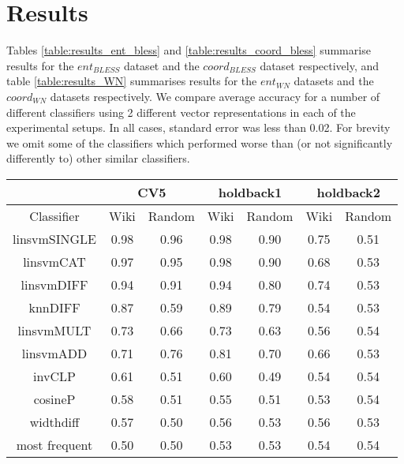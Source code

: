 \documentclass[11pt]{article}
\begin{document}
\section{Results}
\label{sect:results}

Tables \ref{table:results_ent_bless} and \ref{table:results_coord_bless} summarise results for the $ent_{BLESS}$ dataset and the $coord_{BLESS}$ dataset respectively, and table \ref{table:results_WN} summarises results for the $ent_{WN}$ datasets and the $coord_{WN}$ datasets respectively.  We compare average accuracy for a number of different classifiers using 2 different vector representations in each of the experimental setups.  In all cases, standard error was less than 0.02.  For brevity we omit some of the classifiers which performed worse than (or not significantly differently to) other similar classifiers.

\begin{table*}[ht]
\centering
\begin{tabular}{|c|c|c|c|c|c|c|}
\hline
&\multicolumn{2}{|c|}{CV5}&\multicolumn{2}{|c|}{holdback1}&\multicolumn{2}{|c|}{holdback2}\\
\hline
Classifier&Wiki&Random&Wiki&Random&Wiki&Random\\
\hline
linsvmSINGLE&0.98&0.96&0.98&0.90&0.75&0.51\\
linsvmCAT&0.97&0.95&0.98&0.90&0.68&0.53\\
linsvmDIFF&0.94&0.91&0.94&0.80&0.74&0.53\\
knnDIFF&0.87&0.59&0.89&0.79&0.54&0.53\\
linsvmMULT&0.73&0.66&0.73&0.63&0.56&0.54\\
linsvmADD&0.71&0.76&0.81&0.70&0.66&0.53\\
invCLP&0.61&0.51&0.60&0.49&0.54&0.54\\
cosineP&0.58&0.51&0.55&0.51&0.53&0.54\\
widthdiff&0.57&0.50&0.56&0.53&0.56&0.53\\
most frequent&0.50&0.50&0.53&0.53&0.54&0.54\\
\hline
\end{tabular}
\caption{Accuracy Figures for the \emph{$ent_{BLESS}$} data set using the 3 different experimental setups (Errors $< $0.02)}
\label{table:results_ent_bless}
\end{table*}
\end{document}
